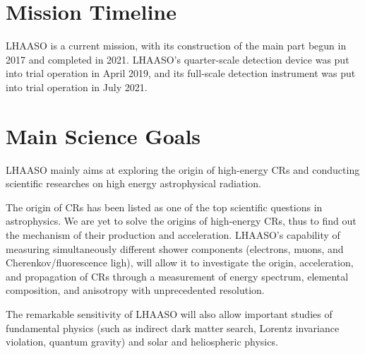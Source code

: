 \documentclass[UTF8, 11pt]{article}
\begin{document}
\section{Mission Timeline}

LHAASO is a current mission\cite{ihep2023}, with its construction of the main part begun in 2017 and completed in 2021. LHAASO's quarter-scale detection device was put into trial operation in April 2019, and its full-scale detection instrument was put into trial operation in July 2021.

\section{Main Science Goals}

LHAASO mainly aims at exploring the origin of high-energy CRs and conducting scientific researches on high energy astrophysical radiation\cite{lhaaso}.

The origin of CRs has been listed as one of the top scientific questions in astrophysics. We are yet to solve the origins of high-energy CRs, thus to find out the mechanism of their production and acceleration. LHAASO’s capability of measuring simultaneously different shower components (electrons, muons, and Cherenkov/fluorescence ligh), will allow it to investigate the origin, acceleration, and propagation of CRs through a measurement of energy spectrum, elemental composition, and anisotropy with unprecedented resolution.

The remarkable sensitivity of LHAASO will also allow important studies of fundamental physics (such as indirect dark matter search, Lorentz invariance violation, quantum gravity) and solar and heliospheric physics\cite{ihep2023}.


\end{document}
